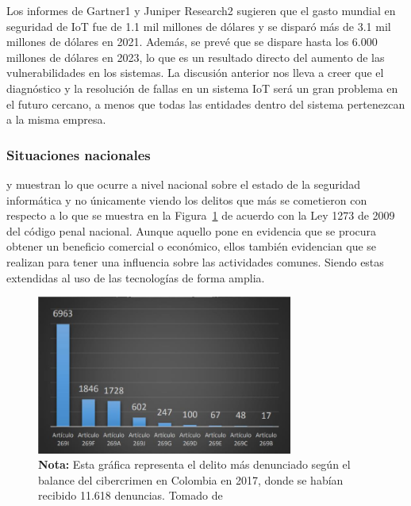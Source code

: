 \begin{displayquote}
  Los informes de Gartner1 y Juniper Research2 sugieren que el gasto mundial en
  seguridad de IoT fue de 1.1 mil millones de dólares y se disparó más de 3.1
  mil millones de dólares en 2021. Además, se prevé que se dispare hasta los
  6.000 millones de dólares en 2023, lo que es un resultado directo del aumento
  de las vulnerabilidades en los sistemas. La discusión anterior nos lleva a
  creer que el diagnóstico y la resolución de fallas en un sistema IoT será un
  gran problema en el futuro cercano, a menos que todas las entidades dentro del
  sistema pertenezcan a la misma empresa. \parencite{Singh2022}
\end{displayquote}

\subsubsection{Situaciones nacionales}

\textcite{CanoMartinez2022} y \textcite{Mosquera2019} muestran lo que ocurre a
nivel nacional sobre el estado de la seguridad informática y no únicamente
viendo los delitos que más se cometieron con respecto a lo que se muestra en la
Figura~\ref{fig:delitos} de acuerdo con la Ley 1273 de 2009 del código penal
nacional. Aunque aquello pone en evidencia que se procura obtener un beneficio
comercial o económico, ellos también evidencian que se realizan para tener una
influencia sobre las actividades comunes. Siendo estas extendidas al uso de las
tecnologías de forma amplia.

\begin{figure}[htb]
  \centering
  \includegraphics[width=0.75\textwidth]{./pictures/delitos.png}
  \caption{
    \textbf{Nota:} Esta gráfica representa el delito más denunciado según el
    balance del cibercrimen en Colombia en 2017, donde se habían recibido
    11.618 denuncias. Tomado de \cite{Mosquera2019}
  }
  \label{fig:delitos}
\end{figure}

